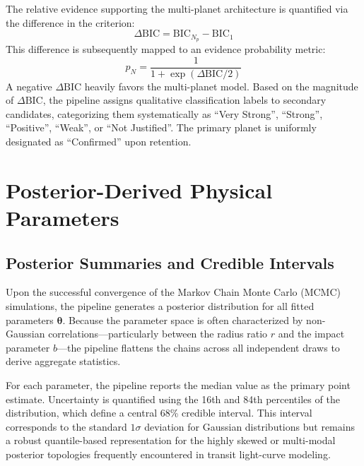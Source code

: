 \documentclass[12pt,a4paper,oneside]{report}
\begin{document}
The relative evidence supporting the multi-planet architecture is quantified via the difference in the criterion:
\begin{equation}
  \Delta\mathrm{BIC} = \mathrm{BIC}_{N_p} - \mathrm{BIC}_{1}
\end{equation}
This difference is subsequently mapped to an evidence probability metric:
\begin{equation}
  p_{N} = \frac{1}{1 + \exp(\Delta\mathrm{BIC}/2)}
\end{equation}
A negative $\Delta\mathrm{BIC}$ heavily favors the multi-planet model. Based on the magnitude of $\Delta\mathrm{BIC}$, the pipeline assigns qualitative classification labels to secondary candidates, categorizing them systematically as ``Very Strong'', ``Strong'', ``Positive'', ``Weak'', or ``Not Justified''. The primary planet is uniformly designated as ``Confirmed'' upon retention.

\chapter{Posterior-Derived Physical Parameters}

\section{Posterior Summaries and Credible Intervals}
Upon the successful convergence of the Markov Chain Monte Carlo (MCMC) simulations, the pipeline generates a posterior distribution for all fitted parameters $\boldsymbol{\theta}$. Because the parameter space is often characterized by non-Gaussian correlations—particularly between the radius ratio $r$ and the impact parameter $b$—the pipeline flattens the chains across all independent draws to derive aggregate statistics.

For each parameter, the pipeline reports the median value as the primary point estimate. Uncertainty is quantified using the 16th and 84th percentiles of the distribution, which define a central 68\% credible interval. This interval corresponds to the standard $1\sigma$ deviation for Gaussian distributions but remains a robust quantile-based representation for the highly skewed or multi-modal posterior topologies frequently encountered in transit light-curve modeling.
\end{document}
